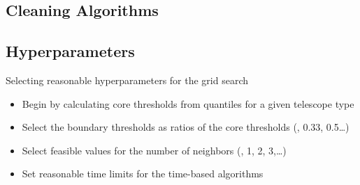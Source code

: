 \subsection{Cleaning Algorithms}%
\label{sub:Cleaning_algorithms}

    {%
    
    }
    {%
    
    }

\subsection{Hyperparameters}%
\label{sub:Hyperparameters}
\begin{frame}{Selecting reasonable hyperparameters for the grid search}
    \begin{overlayarea}{\textwidth}{2.5cm}
        \begin{itemize}
            \item<1-> Begin by calculating core thresholds from quantiles for a given telescope type
            \item<3-> Select the boundary thresholds as ratios of the core thresholds (, 0.33, 0.5\dots)
            \item<4-> Select feasible values for the number of neighbors (, 1, 2, 3,\dots)
            \item<5-> Set reasonable time limits for the time-based algorithms
        \end{itemize}
    \end{overlayarea}
    \begin{overlayarea}{\textwidth}{\textheight}
    \end{overlayarea}
\end{frame}